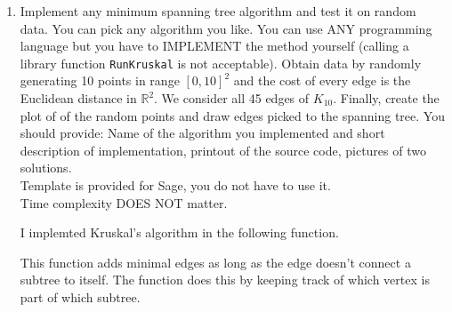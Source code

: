 \documentclass[11pt, oneside]{article}
\begin{document}
\begin{enumerate}
  \item %
    Implement any minimum spanning tree algorithm and test it on random data.
    You can pick any algorithm you like. You can use ANY programming language but you have to IMPLEMENT the method yourself (calling a library function \texttt{RunKruskal} is not acceptable).
    Obtain data by randomly generating 10 points in range $[0,10]^2$ and the cost of every edge is the Euclidean distance in $\mathbb{R}^2$.
    We consider all 45 edges of $K_{10}$.
    Finally, create the plot of of the random points and draw edges picked to the spanning tree. You should provide: Name of the algorithm you implemented and short description of implementation, printout of the source code, pictures of two solutions.\\
    Template is provided for Sage, you do not have to use it.\\
    Time complexity DOES NOT matter. 

    I implemted Kruskal's algorithm in the following function.
    
    This function adds minimal edges as long as the edge doesn't connect
    a subtree to itself.
    The function does this by keeping track of which vertex is part of which
    subtree.


\end{enumerate}
\end{document}
